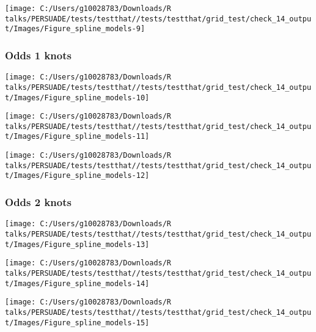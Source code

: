 \documentclass[
]{article}
\begin{document}
\begin{flushleft}\texttt{[image: C:/Users/g10028783/Downloads/R talks/PERSUADE/tests/testthat//tests/testthat/grid\_test/check\_14\_output/Images/Figure\_spline\_models-9]} \end{flushleft}

\clearpage

\subsubsection{Odds 1 knots}\label{odds-1-knots}

\begin{flushleft}\texttt{[image: C:/Users/g10028783/Downloads/R talks/PERSUADE/tests/testthat//tests/testthat/grid\_test/check\_14\_output/Images/Figure\_spline\_models-10]} \end{flushleft}

\begin{flushleft}\texttt{[image: C:/Users/g10028783/Downloads/R talks/PERSUADE/tests/testthat//tests/testthat/grid\_test/check\_14\_output/Images/Figure\_spline\_models-11]} \end{flushleft}

\begin{flushleft}\texttt{[image: C:/Users/g10028783/Downloads/R talks/PERSUADE/tests/testthat//tests/testthat/grid\_test/check\_14\_output/Images/Figure\_spline\_models-12]} \end{flushleft}

\clearpage

\subsubsection{Odds 2 knots}\label{odds-2-knots}

\begin{flushleft}\texttt{[image: C:/Users/g10028783/Downloads/R talks/PERSUADE/tests/testthat//tests/testthat/grid\_test/check\_14\_output/Images/Figure\_spline\_models-13]} \end{flushleft}

\begin{flushleft}\texttt{[image: C:/Users/g10028783/Downloads/R talks/PERSUADE/tests/testthat//tests/testthat/grid\_test/check\_14\_output/Images/Figure\_spline\_models-14]} \end{flushleft}

\begin{flushleft}\texttt{[image: C:/Users/g10028783/Downloads/R talks/PERSUADE/tests/testthat//tests/testthat/grid\_test/check\_14\_output/Images/Figure\_spline\_models-15]} \end{flushleft}
\end{document}
